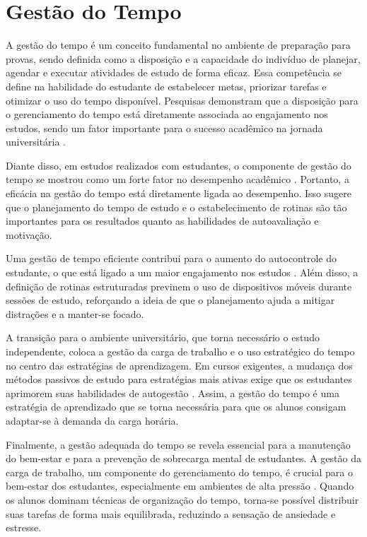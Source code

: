 \section{Gestão do Tempo}

A gestão do tempo é um conceito fundamental no ambiente de preparação para provas, sendo definida como a disposição e a capacidade do indivíduo de planejar, agendar e executar atividades de estudo de forma eficaz.
Essa competência se define na habilidade do estudante de estabelecer metas, priorizar tarefas e otimizar o uso do tempo disponível.
Pesquisas demonstram que a disposição para o gerenciamento do tempo está diretamente associada ao engajamento nos estudos, sendo um fator importante para o sucesso acadêmico na jornada universitária \cite{fu_2025}.

Diante disso, em estudos realizados com estudantes, o componente de gestão do tempo se mostrou como um forte fator no desempenho acadêmico \cite{zhou_2016}. Portanto, a eficácia na gestão do tempo está diretamente ligada ao desempenho.
Isso sugere que o planejamento do tempo de estudo e o estabelecimento de rotinas são tão importantes para os resultados quanto as habilidades de autoavaliação e motivação.

Uma gestão de tempo eficiente contribui para o aumento do autocontrole do estudante, o que está ligado a um maior engajamento nos estudos \cite{fu_2025}.
Além disso, a definição de rotinas estruturadas previnem o uso de dispositivos móveis durante sessões de estudo, reforçando a ideia de que o planejamento ajuda a mitigar distrações e a manter-se focado.

A transição para o ambiente universitário, que torna necessário o estudo independente, coloca a gestão da carga de trabalho e o uso estratégico do tempo no centro das estratégias de aprendizagem.
Em cursos exigentes, a mudança dos métodos passivos de estudo para estratégias mais ativas exige que os estudantes aprimorem suas habilidades de autogestão \cite{harvey_2025}.
Assim, a gestão do tempo é uma estratégia de aprendizado que se torna necessária para que os alunos consigam adaptar-se à demanda da carga horária.

Finalmente, a gestão adequada do tempo se revela essencial para a manutenção do bem-estar e para a prevenção de sobrecarga mental de estudantes.
A gestão da carga de trabalho, um componente do gerenciamento do tempo, é crucial para o bem-estar dos estudantes, especialmente em ambientes de alta pressão \cite{harvey_2025}.
Quando os alunos dominam técnicas de organização do tempo, torna-se possível distribuir suas tarefas de forma mais equilibrada, reduzindo a sensação de ansiedade e estresse.

